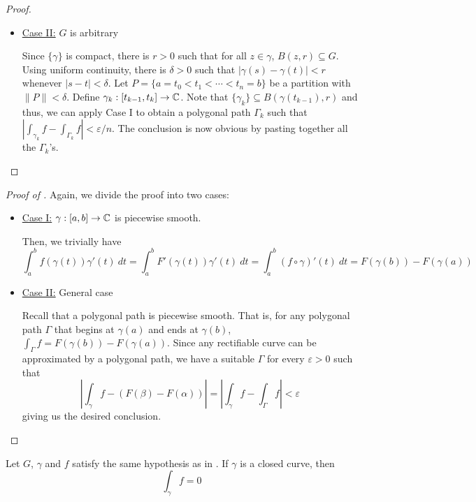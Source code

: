 \begin{proof}
\begin{itemize}
    This completes the proof for the first case.

    \item \underline{Case II:} $G$ is arbitrary

    Since $\{\gamma\}$ is compact, there is $r > 0$ such that for all $z\in\gamma$, $B(z, r)\subseteq G$. Using uniform continuity, there is $\delta > 0$ such that $|\gamma(s) - \gamma(t)| < r$ whenever $|s - t| < \delta$. Let $P = \{a = t_0 < t_1 < \cdots < t_n = b\}$ be a partition with $\|P\| < \delta$. Define $\gamma_k: [t_{k - 1}, t_k]\to\mathbb{C}$. Note that $\{\gamma_k\}\subseteq B(\gamma(t_{k - 1}), r)$ and thus, we can apply Case I to obtain a polygonal path $\Gamma_k$ such that $|\int_{\gamma_k} f - \int_{\Gamma_k} f| < \varepsilon/n$. The conclusion is now obvious by pasting together all the $\Gamma_k$'s.
\end{itemize}
\end{proof}

\begin{proof}[Proof of ]
Again, we divide the proof into two cases: 
\begin{itemize}
    \item \underline{Case I:} $\gamma:[a,b]\to\mathbb{C}$ is piecewise smooth.

    Then, we trivially have 
    \begin{equation*}
        \int_a^b f(\gamma(t))\gamma'(t)~dt = \int_a^b F'(\gamma(t))\gamma'(t)~dt = \int_a^b (f\circ\gamma)'(t)~dt = F(\gamma(b)) - F(\gamma(a))
    \end{equation*}

    \item \underline{Case II:} General case

    Recall that a polygonal path is piecewise smooth. That is, for any polygonal path $\Gamma$ that begins at $\gamma(a)$ and ends at $\gamma(b)$, $\int_\Gamma f = F(\gamma(b)) - F(\gamma(a))$. Since any rectifiable curve can be approximated by a polygonal path, we have a suitable $\Gamma$ for every $\varepsilon > 0$ such that 
    \begin{equation*}
        \left|\int_\gamma f - (F(\beta) - F(\alpha))\right| = \left|\int_\gamma f - \int_\Gamma f\right| < \varepsilon
    \end{equation*}
    giving us the desired conclusion.
\end{itemize}
\end{proof}

\begin{corollary}
    Let $G$, $\gamma$ and $f$ satisfy the same hypothesis as in . If $\gamma$ is a closed curve, then 
    \begin{equation*}
        \int_\gamma f = 0
    \end{equation*}
\end{corollary}

